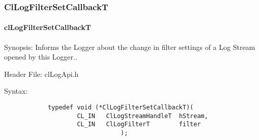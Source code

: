 \begin{flushleft}
\subsubsection{ClLogFilterSetCallbackT}
\hypertarget{pagelog111}{}\paragraph{cl\-Log\-Filter\-Set\-CallbackT}\label{pagelog111}
\begin{Desc}
\item[Synopsis:] Informs the Logger about the change in filter settings of a Log Stream opened by this Logger..\end{Desc}
\begin{Desc}
\item[Header File:] clLogApi.h \end{Desc}
\begin{Desc}
\item[Syntax:]
\footnotesize\begin{verbatim}        	
			typedef void (*ClLogFilterSetCallbackT)(
					CL_IN	ClLogStreamHandleT	hStream,
					CL_IN	ClLogFilterT		filter
								);


\end{verbatim}
\end{Desc}
\end{flushleft}
